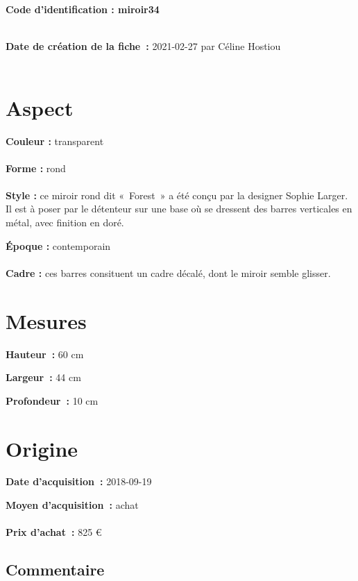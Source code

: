  
    
    
    {\bf \huge Code d’identification : miroir34}
    \\ \\ \hr
    \begin{center}
    \end{center}
    
    {\bf \large Date de création de la fiche :} 2021-02-27
    {par Céline Hostiou}
   \\ \\ \hr
    \section* {Aspect}
   {\bf \large Couleur :} transparent
    \\ \\ {\bf \large Forme :}  rond
    \\ \\ {\bf \large Style :} 
            ce miroir rond dit « Forest » a été conçu par la designer Sophie
            Larger. Il est à poser par le détenteur sur une base où se dressent des barres
            verticales en métal, avec finition en doré.
        
        {\bf \large Époque :} contemporain
    \\ \\ {\bf \large Cadre :} ces barres consituent un cadre décalé, dont le miroir semble glisser.
    \section* {Mesures}
      
  {\bf \large Hauteur :} 60 cm
   
   {\bf \large Largeur :} 44 cm
    
   {\bf \large Profondeur :} 10 cm
     
    \section* {Origine}
    {\bf \large Date d’acquisition :} 2018-09-19

    {\bf \large Moyen d’acquisition :} achat
          \\ \\{\bf \large Prix d’achat :} 825 €
        
      \subsection* {Commentaire}
       
